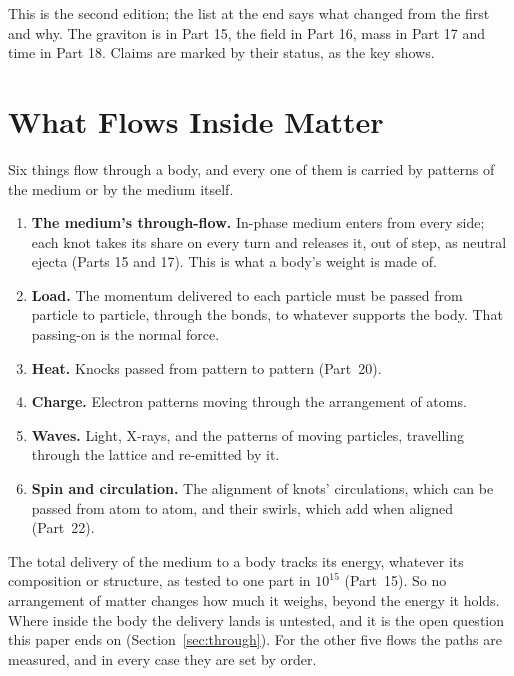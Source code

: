 \documentclass[11pt,a4paper]{article}
\begin{document}
This is the second edition; the list at the end says what changed from the first and why. The graviton is in Part 15, the field in Part 16, mass in Part 17 and time in Part 18. Claims are marked by their status, as the key shows.

\statuskey

\section{What Flows Inside Matter}
\label{sec:inventory}

\begin{hypbar}
Six things flow through a body, and every one of them is carried by patterns of the medium or by the medium itself.
\begin{enumerate}
\item \textbf{The medium's through-flow.} In-phase medium enters from every side; each knot takes its share on every turn and releases it, out of step, as neutral ejecta (Parts 15 and 17). This is what a body's weight is made of.
\item \textbf{Load.} The momentum delivered to each particle must be passed from particle to particle, through the bonds, to whatever supports the body. That passing-on is the normal force.
\item \textbf{Heat.} Knocks passed from pattern to pattern (Part~20).
\item \textbf{Charge.} Electron patterns moving through the arrangement of atoms.
\item \textbf{Waves.} Light, X-rays, and the patterns of moving particles, travelling through the lattice and re-emitted by it.
\item \textbf{Spin and circulation.} The alignment of knots' circulations, which can be passed from atom to atom, and their swirls, which add when aligned (Part~22).\footnotemark{}
\end{enumerate}
\end{hypbar}

 The total delivery of the medium to a body tracks its energy, whatever its composition or structure, as tested to one part in $10^{15}$ (Part~15). So no arrangement of matter changes how much it weighs, beyond the energy it holds. Where inside the body the delivery lands is untested, and it is the open question this paper ends on (Section~\ref{sec:through}). For the other five flows the paths are measured, and in every case they are set by order.
\end{document}
